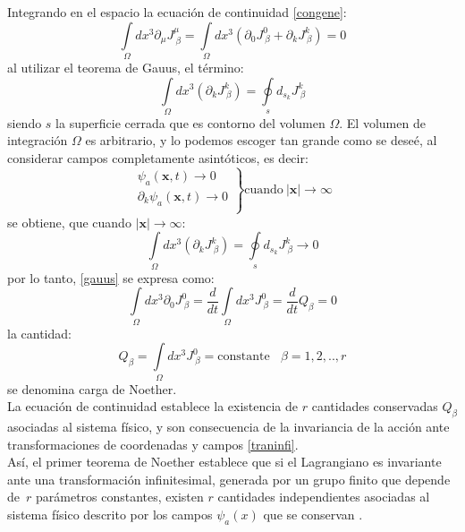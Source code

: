 \documentclass[a4paper,12pt]{article}
\begin{document}
Integrando en el espacio la ecuación de continuidad \eqref{congene}:
\begin{equation}
\int\limits_{\Omega}dx^{3}\partial_\mu J^\mu_{\ \beta}=\int\limits_{\Omega}dx^{3}(\partial_0 J^0_{\ \beta}+\partial_k J^k_{\ \beta})=0 
\label{gauus}
\end{equation}
al utilizar el teorema de Gauus, el término:
\begin{equation}
\int\limits_{\Omega}dx^{3}(\partial_k J^k_{\ \beta})=\oint\limits_{s}d_{s_k}J^k_{\ \beta}
\end{equation}
siendo $s$ la superficie cerrada que es contorno del volumen $\Omega$. El volumen de integración $\Omega$ es arbitrario, y lo podemos escoger tan grande como se deseé, al considerar campos completamente asintóticos, es decir:
\begin{equation}
\left.\begin{array}{lcl}
\psi_a(\textbf{x},t)\rightarrow0 \\
\partial_k \psi_a(\textbf{x},t)\rightarrow0 \\
\end{array}
\right\} \mbox{cuando}\ |\textbf{x}|\rightarrow\infty
\label{asindos}
\end{equation}
se obtiene, que cuando $|\textbf{x}|\rightarrow\infty$:
\begin{equation}
\int\limits_{\Omega}dx^{3}(\partial_k J^k_{\ \beta})=\oint\limits_{s}d_{s_k}J^k_{\ \beta}\rightarrow0  
\end{equation}
por lo tanto, \eqref{gauus} se expresa como:
\begin{equation}
\int\limits_{\Omega}dx^{3}\partial_0 J^0_{\ \beta}=\frac{d}{dt}\int\limits_{\Omega}dx^{3}J^0_{\ \beta}=\frac{d}{dt}Q_{\beta}= 0 
\end{equation}
la cantidad:
\begin{equation}
Q_{\beta}=\int\limits_{\Omega}dx^{3}J^0_{\ \beta}=\mbox{constante} \ \ \ \ \beta=1,2,..,r
\label{carnoem}
\end{equation}
se denomina carga de Noether.
\\

La ecuación de continuidad establece la existencia de $r$ cantidades conservadas $Q_{\beta}$ asociadas al sistema físico, y son consecuencia de la invariancia de la acción ante transformaciones de coordenadas y campos \eqref{traninfi}. 
\\

Así, el primer teorema de Noether establece que si el Lagrangiano es invariante ante una transformación infinitesimal, generada por un grupo finito que depende \mbox{de $r$} parámetros constantes, existen $r$ cantidades independientes asociadas al sistema físico descrito por los campos $\psi_a(x)$ que se conservan \cite{ noether,general, greiner, emmy}. 
\\
\end{document}

